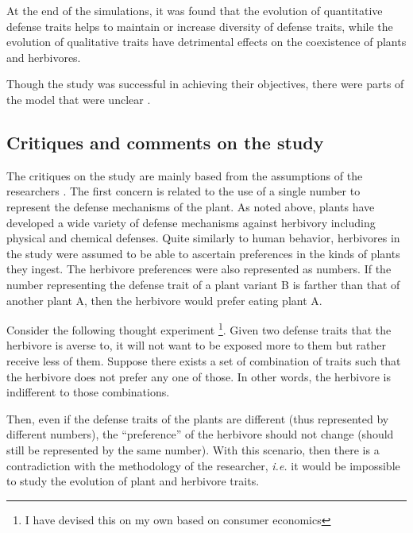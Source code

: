 At the end of the simulations, it was found that the evolution of quantitative defense traits helps to maintain or increase diversity of defense traits, 
while the evolution of qualitative traits have detrimental effects on the coexistence of plants and herbivores.

Though the study was successful in achieving their objectives, there were parts of the model that were unclear \footnotemark.


\subsection{Critiques and comments on the study}

The critiques on the study are mainly based from the assumptions of the researchers \footnotemark.
The first concern is related to the use of a single number to represent the defense mechanisms of the plant.
As noted above, plants have developed a wide variety of defense mechanisms against herbivory including physical and chemical defenses.
Quite similarly to human behavior, herbivores in the study were assumed to be able to ascertain preferences in the kinds of plants they ingest.
The herbivore preferences were also represented as numbers.
If the number representing the defense trait of a plant variant B is farther than that of another plant A, then the herbivore would prefer eating plant A.

Consider the following thought experiment
\footnote{I have devised this on my own based on consumer economics}.
Given two defense traits that the herbivore is averse to, it will not want to be exposed more to them but rather receive less of them.
Suppose there exists a set of combination of traits such that the herbivore does not prefer any one of those.
In other words, the herbivore is indifferent to those combinations.

Then, even if the defense traits of the plants are different (thus represented by different numbers), the ``preference'' of the herbivore should not change (should still be represented by the same number).
With this scenario, then there is a contradiction with the methodology of the researcher, \textit{i.e.} it would be impossible to study the evolution of plant and herbivore traits.

